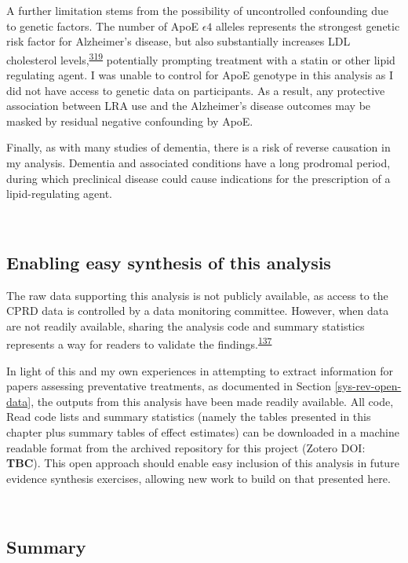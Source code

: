 \documentclass[a4paper, twoside]{templates/ociamthesis}
\begin{document}
A further limitation stems from the possibility of uncontrolled confounding due to genetic factors. The number of ApoE \(\epsilon4\) alleles represents the strongest genetic risk factor for Alzheimer's disease, but also substantially increases LDL cholesterol levels,\textsuperscript{\protect\hyperlink{ref-bennet2007}{319}} potentially prompting treatment with a statin or other lipid regulating agent. I was unable to control for ApoE genotype in this analysis as I did not have access to genetic data on participants. As a result, any protective association between LRA use and the Alzheimer's disease outcomes may be masked by residual negative confounding by ApoE.

Finally, as with many studies of dementia, there is a risk of reverse causation in my analysis. Dementia and associated conditions have a long prodromal period, during which preclinical disease could cause indications for the prescription of a lipid-regulating agent.

~

\hypertarget{cprd-data-avail}{%
\subsection{Enabling easy synthesis of this analysis}\label{cprd-data-avail}}

The raw data supporting this analysis is not publicly available, as access to the CPRD data is controlled by a data monitoring committee. However, when data are not readily available, sharing the analysis code and summary statistics represents a way for readers to validate the findings.\textsuperscript{\protect\hyperlink{ref-goldacre2019}{137}}

In light of this and my own experiences in attempting to extract information for papers assessing preventative treatments, as documented in Section \ref{sys-rev-open-data}, the outputs from this analysis have been made readily available. All code, Read code lists and summary statistics (namely the tables presented in this chapter plus summary tables of effect estimates) can be downloaded in a machine readable format from the archived repository for this project (Zotero DOI: \textbf{TBC}). This open approach should enable easy inclusion of this analysis in future evidence synthesis exercises, allowing new work to build on that presented here.

~

\hypertarget{summary-4}{%
\subsection{Summary}\label{summary-4}}
\end{document}
